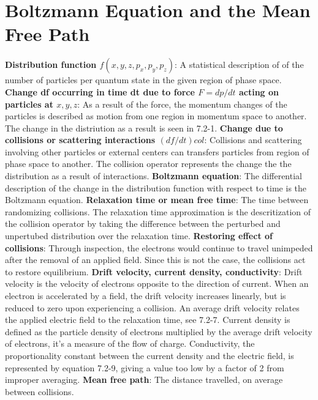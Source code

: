\documentclass{article}
\numberwithin{equation}{section}
\begin{document}
\section*{Boltzmann Equation and the Mean Free Path}
\textbf{Distribution function $f(x,y,z,p_x,p_y,p_z)$}: A statistical description of of the number of particles per quantum state in the given region of phase space.
\newline
\textbf{Change df occurring in time dt due to force $F=dp/dt$ acting on particles at $x,y,z$}: As a result of the force, the momentum changes of the particles is described as motion from one region in momentum space to another. The change in the distriution as a result is seen in 7.2-1.
\newline
\textbf{Change due to collisions or scattering interactions $(df/dt)col$}: Collisions and scattering involving other particles or external centers can transfers particles from region of phase space to another. The collision operator represents the change the the distribution as a result of interactions. 
\newline
\textbf{Boltzmann equation}: The differential description of the change in the distribution function with respect to time is the Boltzmann equation. 
\newline
\textbf{Relaxation time or mean free time}: The time between randomizing collisions. The relaxation time approximation is the descritization of the collision operator by taking the difference between the perturbed and unpertubed distribution over the relaxation time. 
\newline
\textbf{Restoring effect of collisions}: Through inspection, the electrons would continue to travel unimpeded after the removal of an applied field. Since this is not the case, the collisions act to restore equilibrium.
\newline
\textbf{Drift velocity, current density, conductivity}: Drift velocity is the velocity of electrons opposite to the direction of current. When an electron is accelerated by a field, the drift velocity increases linearly, but is reduced to zero upon experiencing a collision. An average drift velocity relates the applied electric field to the relaxation time, see 7.2-7. Current density is defined as the particle density of electrons multiplied by the average drift velocity of electrons, it's a measure of the flow of charge. Conductivity, the proportionality constant between the current density and the electric field, is represented by equation 7.2-9, giving a value too low by a factor of 2 from improper averaging.
\newline
\textbf{Mean free path}: The distance travelled, on average between collisions.
\end{document}
